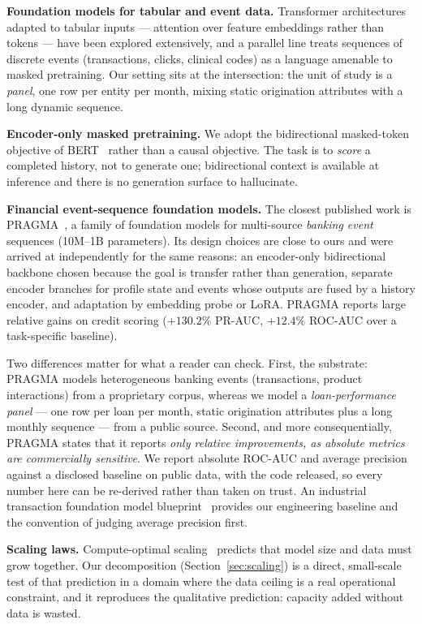 \documentclass[10pt,letterpaper]{article}
\begin{document}
\textbf{Foundation models for tabular and event data.}
Transformer architectures adapted to tabular inputs --- attention over feature embeddings rather
than tokens --- have been explored extensively, and a parallel line treats sequences of discrete
events (transactions, clicks, clinical codes) as a language amenable to masked pretraining. Our
setting sits at the intersection: the unit of study is a \emph{panel}, one row per entity per
month, mixing static origination attributes with a long dynamic sequence.

\textbf{Encoder-only masked pretraining.}
We adopt the bidirectional masked-token objective of BERT~\cite{devlin2019bert} rather than a
causal objective. The task is to \emph{score} a completed history, not to generate one; bidirectional
context is available at inference and there is no generation surface to hallucinate.

\textbf{Financial event-sequence foundation models.}
The closest published work is PRAGMA~\cite{pragma2026}, a family of foundation models for
multi-source \emph{banking event} sequences (10M--1B parameters). Its design choices are close to
ours and were arrived at independently for the same reasons: an encoder-only bidirectional backbone
chosen because the goal is transfer rather than generation, separate encoder branches for profile
state and events whose outputs are fused by a history encoder, and adaptation by embedding probe or
LoRA. PRAGMA reports large relative gains on credit scoring ($+130.2\%$ PR-AUC, $+12.4\%$ ROC-AUC
over a task-specific baseline).

Two differences matter for what a reader can check. First, the substrate: PRAGMA models
heterogeneous banking events (transactions, product interactions) from a proprietary corpus,
whereas we model a \emph{loan-performance panel} --- one row per loan per month, static origination
attributes plus a long monthly sequence --- from a public source. Second, and more consequentially,
PRAGMA states that it reports \emph{only relative improvements, as absolute metrics are
commercially sensitive}. We report absolute ROC-AUC and average precision against a disclosed
baseline on public data, with the code released, so every number here can be re-derived rather than
taken on trust. An industrial transaction foundation model blueprint~\cite{nvidiatfm} provides our
engineering baseline and the convention of judging average precision first.

\textbf{Scaling laws.}
Compute-optimal scaling~\cite{hoffmann2022chinchilla} predicts that model size and data must grow
together. Our decomposition (Section~\ref{sec:scaling}) is a direct, small-scale test of that
prediction in a domain where the data ceiling is a real operational constraint, and it reproduces
the qualitative prediction: capacity added without data is wasted.
\end{document}
